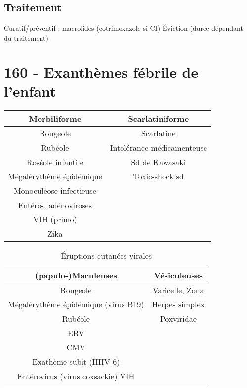 \subsection{Traitement}

Curatif/préventif : macrolides (cotrimoxazole si CI) Éviction (durée
dépendant du traitement) 

\section{160 - Exanthèmes fébrile de l'enfant}

\begin{table}[htpb]
  \centering
  \begin{tabular}{cc}
    \toprule
    Morbiliforme & Scarlatiniforme\\
    \midrule
    Rougeole & Scarlatine\\
    Rubéole & Intolérance médicamenteuse\\
    Roséole infantile & Sd de Kawasaki\\
    Mégalérythème épidémique & Toxic-shock sd\\
    Monoculéose infectieuse & \\
    Entéro-, adénoviroses & \\
    VIH (primo) & \\
    Zika  & \\
    \bottomrule
  \end{tabular}
\end{table}

\begin{table}[htpb]
  \centering
  \caption{Éruptions cutanées virales}
  \begin{tabular}{cc}

    \toprule
    (papulo-)Maculeuses & Vésiculeuses\\
    \midrule
    Rougeole & Varicelle, Zona\\
    Mégalérythème épidémique (virus B19) & Herpes simplex\\
    Rubéole & Poxviridae \\
    EBV &\\
    CMV &\\
    Exathème subit (HHV-6) & \\
    Entérovirus (virus coxsackie) VIH & \\
    \bottomrule

  \end{tabular}
\end{table}

